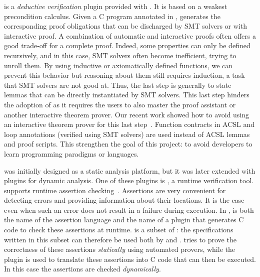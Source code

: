\Wp is a \emph{deductive verification} plugin provided with \framac.
It is based on a weakest precondition calculus.
Given a C program annotated in \acsl, \Wp generates the corresponding proof obligations that can be discharged by SMT solvers or with interactive proof.
A combination of automatic and interactive proofs often offers a good trade-off for a complete proof.
Indeed, some properties can only be defined recursively, and in this case, SMT solvers often become inefficient, trying to unroll them.
By using inductive or axiomatically defined functions, we can prevent this behavior but reasoning about them still requires induction, a task that SMT solvers are not good at.
Thus, the last step is generally to state lemmas that can be directly instantiated by SMT solvers.
This last step hinders the adoption of \framac as it requires the users to also master the \Coq proof assistant or another interactive theorem prover.
Our recent work showed how to avoid using an interactive theorem prover for this last step~\cite{BLK2019:NFM}.
Function contracts in ACSL and loop annotations (verified using SMT solvers) are used instead of ACSL lemmas and \Coq proof scripts.
This strengthen the goal of this project: to avoid developers to learn programming paradigms or languages.

\framac was initially designed as a static analysis platform, but it was later extended with plugins for dynamic analysis.
One of these plugins is \eacsl, a runtime verification tool.
\eacsl supports runtime assertion checking~\cite{CR2006:SEN}.
Assertions are very convenient for detecting errors and providing information about their locations.
It is the case even when such an error does not result in a failure during execution.
In \framac, \eacsl is both the name of the assertion language and the name of a plugin that generates C code to check these assertions at runtime.
\eacsl is a subset of \acsl: the specifications written in this subset can therefore be used both by \Wp and \eacsl.
\Wp tries to prove the correctness of these assertions {\em statically} using automated provers, while the plugin \eacsl is used to translate these assertions into C code that can then be executed.
In this case the assertions are checked {\em dynamically}.